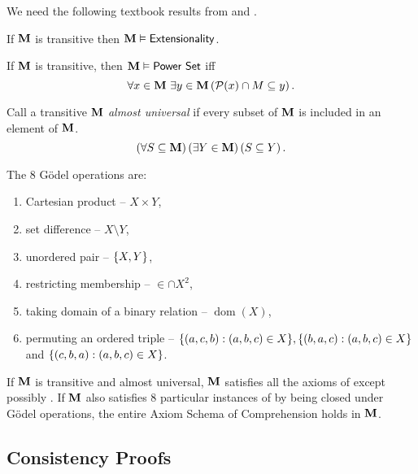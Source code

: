 We need the following textbook results from \autocite{kunen1980} and \autocite{jech1973}.

\begin{lemma} \label{lemma:transitive_extensional}
    If \(\mathbf{M}\) is transitive then \(\mathbf{M}\vDash{\normalfont\textsf{Extensionality}}\).
\end{lemma}

\begin{lemma} \label{lemma:power_set}
    If \(\mathbf{M}\) is transitive, then \(\mathbf{M}\vDash{\normalfont\textsf{Power Set}}\) iff
    \[ \forall x\in\mathbf{M}\ \exists y\in \mathbf{M} \left(\mathcal{P}(x)\cap M \subseteq y\right). \]
\end{lemma}

\begin{definition}
    Call a transitive \(\mathbf{M}\) \emph{almost universal} if
    every subset of \(\mathbf{M}\) is included in an element of \(\mathbf{M}\).
    \[ \left(\forall S\subseteq \mathbf{M}\right)\left(\exists Y\in \mathbf{M}\right)\left(S\subseteq Y\right). \]
\end{definition}
\begin{definition}
    The 8 Gödel operations are:
    \begin{enumerate}
        \item Cartesian product -- \(X\times Y\),
        \item set difference -- \(X\setminus Y\),
        \item unordered pair -- \({\left\{ X, Y \right\}}\),
        \item restricting membership --  \(\in \cap X^2\),
        \item taking domain of a binary relation -- \(\operatorname{dom}(X)\),
        \item permuting an ordered triple -- \({\left\{ (a,c,b): (a,b,c)\in X \right\}}, {\left\{ (b,a,c): (a,b,c)\in X \right\}}\) and \({\left\{ (c,b,a): (a,b,c)\in X \right\}}\).
    \end{enumerate}
\end{definition}
\begin{theorem} \label{theorem:jech_zf_model}
    If \(\mathbf{M}\) is transitive and almost universal,
    \(\mathbf{M}\) satisfies all the axioms of \ZFminus except possibly .
    If \(\mathbf{M}\) also satisfies 8 particular instances of  by being closed under Gödel operations,
    the entire Axiom Schema of Comprehension holds in \(\mathbf{M}\).
\end{theorem}

\subsection{Consistency Proofs}


